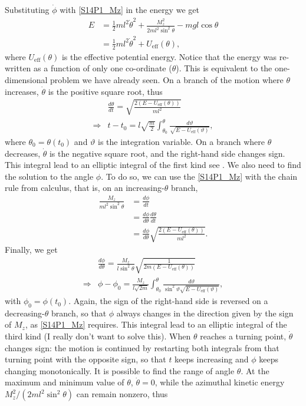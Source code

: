 \begin{problem}[title={Spherical pendulum}]
{\begin{equation*}
\end{equation*}
Substituting $\Dot{\phi}$ with \eqref{S14P1_Mz} in the energy we get
\begin{align*}
    E &= \frac{1}{2}ml^2\Dot{\theta}^2 + \frac{M_z^2}{2ml^2\sin^2{\theta}} - mgl\cos{\theta} \\
    &= \frac{1}{2}ml^2\Dot{\theta}^2 + U_{\text{eff}}(\theta),
\end{align*}
where $U_{\text{eff}}(\theta)$ is the effective potential energy. Notice that the energy was re-written as a function of only one co-ordinate (\ie $\theta$). This is equivalent to the one-dimensional problem we have already seen. On a branch of the motion where $\theta$ increases, $\Dot{\theta}$ is the positive square root, thus
\begin{align*}
    & \frac{d\theta}{dt} = \sqrt{\frac{2\left( E - U_{\text{eff}}(\theta) \right)}{ml^2}} \\
    \Rightarrow & t - t_0 = l\sqrt{\frac{m}{2}} \int_{\theta_0}^{\theta} \frac{d\vartheta}{\sqrt{E - U_{\text{eff}}(\vartheta)}} ,
\end{align*}
where $\theta_0 = \theta(t_0)$ and $\vartheta$ is the integration variable. On a branch where $\theta$ decreases, $\Dot{\theta}$ is the negative square root, and the right-hand side changes sign. This integral lead to an elliptic integral of the first kind see . We also need to find the solution to the angle $\phi$. To do so, we can use the \eqref{S14P1_Mz} with the chain rule from calculus, that is, on an increasing-$\theta$ branch,
\begin{align*}
    \frac{M_z}{ml^2\sin^2{\theta}} &= \frac{d\phi}{dt} \\
    &= \frac{d\phi}{d\theta}\frac{d\theta}{dt} \\
    &= \frac{d\phi}{d\theta}\sqrt{\frac{2\left( E - U_{\text{eff}}(\theta) \right)}{ml^2}}.
\end{align*}
Finally, we get
\begin{align*}
    & \frac{d\phi}{d\theta} =  \frac{M_z}{l\sin^2{\theta}} \sqrt{\frac{1}{2m\left( E - U_{\text{eff}}(\theta) \right)}} \\
    \Rightarrow & \phi - \phi_0 = \frac{M_z}{l\sqrt{2m}}\int_{\theta_0}^{\theta}\frac{d\vartheta}{\sin^2{\vartheta}\sqrt{E - U_{\text{eff}}(\vartheta)}},
\end{align*}
with $\phi_0 = \phi(t_0)$. Again, the sign of the right-hand side is reversed on a decreasing-$\theta$ branch, so that $\phi$ always changes in the direction given by the sign of $M_z$, as \eqref{S14P1_Mz} requires. This integral lead to an elliptic integral of the third kind (I really don't want to solve this). When $\theta$ reaches a turning point, $\Dot{\theta}$ changes sign: the motion is continued by restarting both integrals from that turning point with the opposite sign, so that $t$ keeps increasing and $\phi$ keeps changing monotonically. It is possible to find the range of angle $\theta$. At the maximum and minimum value of $\theta$, $\Dot{\theta}=0$, while the azimuthal kinetic energy $M_z^2/(2ml^2\sin^2{\theta})$ can remain nonzero, thus
}
\end{problem}
